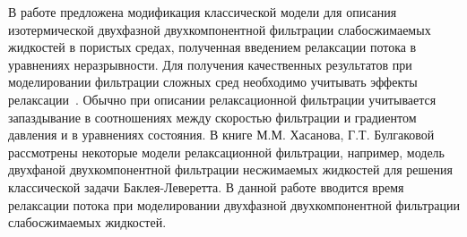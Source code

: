 В работе предложена модификация классической модели для описания изотермической
двухфазной двухкомпонентной фильтрации слабосжимаемых жидкостей в пористых средах, 
полученная введением релаксации потока в уравнениях неразрывности. 
Для получения качественных результатов при моделировании фильтрации сложных
сред необходимо учитывать эффекты релаксации~\cite{Hasanov}.
Обычно при описании релаксационной фильтрации учитывается запаздывание в соотношениях
между скоростью фильтрации и градиентом давления и в уравнениях состояния.
В книге М.М. Хасанова, Г.Т. Булгаковой~\cite{Hasanov} рассмотрены 
некоторые модели релаксационной фильтрации, например, модель двухфаной
двухкомпонентной фильтрации несжимаемых жидкостей для решения классической задачи Баклея-Леверетта.
В данной работе вводится время релаксации потока при моделировании двухфазной двухкомпонентной
фильтрации слабосжимаемых жидкостей. 
